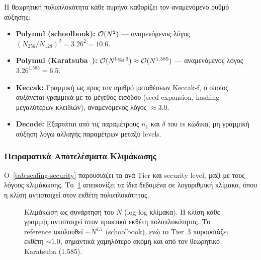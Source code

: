 Η θεωρητική πολυπλοκότητα κάθε πυρήνα καθορίζει τον αναμενόμενο ρυθμό
αύξησης:
\begin{itemize}
  \item \textbf{Polymul (schoolbook):} $\mathcal{O}(N^2)$ — αναμενόμενος λόγος
    $(N_{256}/N_{128})^2 = 3.26^2 = 10.6$.
  \item \textbf{Polymul (Karatsuba~\cite{Karatsuba1962}):} $\mathcal{O}(N^{\log_2 3}) \approx
    \mathcal{O}(N^{1.585})$ — αναμενόμενος λόγος $3.26^{1.585} = 6.5$.
  \item \textbf{Keccak:} Γραμμική ως προς τον αριθμό μεταθέσεων Keccak-f,
    ο οποίος αυξάνεται γραμμικά με το μέγεθος εισόδου (seed expansion,
    hashing μεγαλύτερων κλειδιών), αναμενόμενος λόγος $\approx 3.0$.
  \item \textbf{Decode:} Εξαρτάται από τις παραμέτρους $n_1$ και $\delta$
    του \gls{rs} κώδικα, μη γραμμική αύξηση λόγω αλλαγής παραμέτρων
    μεταξύ levels.
\end{itemize}

\subsubsection{Πειραματικά Αποτελέσματα Κλιμάκωσης}
\label{ssec:scaling-results}

Ο~\cref{tab:scaling-security} παρουσιάζει τα \instret \Decaps ανά Tier
και security level, μαζί με τους λόγους κλιμάκωσης. Το~\cref{fig:scaling-line} απεικονίζει τα ίδια δεδομένα σε λογαριθμική
κλίμακα, όπου η κλίση αντιστοιχεί στον εκθέτη πολυπλοκότητας.

\begin{table}[htbp]
  \centering
  \caption{Κλιμάκωση \Decaps \instret μεταξύ security levels και
    αντίστοιχα speedups (Spike, VLEN $= \num{256}$). Οι στήλες
    $\frac{192}{128}$ και $\frac{256}{128}$ δηλώνουν τον λόγο αύξησης
    \instret ως προς το HQC-128. Το Tier~3 παρουσιάζει τον χαμηλότερο
    λόγο κλιμάκωσης ($3.44\times$), σημαντικά κάτω από τον θεωρητικό
    Karatsuba ($6.5\times$).}
  \label{tab:scaling-security}
  
\end{table}

\begin{figure}[htbp]
  \centering
  
  \caption{Κλιμάκωση \Decaps \instret ως συνάρτηση του $N$ (log-log
    κλίμακα). Η κλίση κάθε γραμμής αντιστοιχεί στον πρακτικό εκθέτη
    πολυπλοκότητας. Το reference ακολουθεί $\sim N^{1.7}$ (schoolbook),
    ενώ το Tier~3 παρουσιάζει εκθέτη $\sim 1.0$, σημαντικά χαμηλότερο
    ακόμη και από τον θεωρητικό Karatsuba ($1.585$).}
  \label{fig:scaling-line}
\end{figure}

